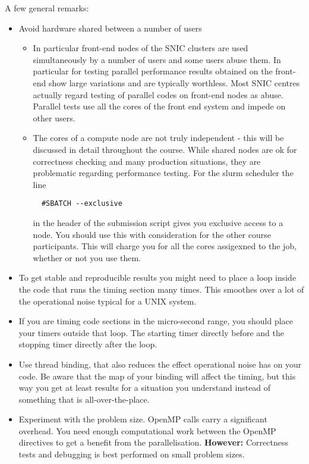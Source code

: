 \documentclass[a4paper,oneside,12pt]{article}
\begin{document}
A few general remarks:
\begin{itemize}
\item Avoid hardware shared between a number of users  
\begin{itemize}
\item In particular front-end nodes of the SNIC clusters are used simultaneously by a number of users and some users abuse them.  In particular for testing parallel performance results obtained on the front-end show large variations and are typically worthless.  Most SNIC centres actually regard testing of parallel codes on front-end nodes as abuse.  Parallel tests use all the cores of the front end system and impede on other users.
\item The cores of a compute node are not truly independent - this will be discussed in detail throughout the course.  While shared nodes are ok for correctness checking and many production situations, they are problematic regarding performance testing.  For the slurm scheduler the line
\begin{verbatim}
  #SBATCH --exclusive
\end{verbatim}
in the header of the submission script gives you exclusive access to a node.  You should use this with consideration for the other course participants.  This will charge you for all the cores assigexned to the job, whether or not you use them.
\end{itemize}
\item To get stable and reproducible results you might need to place a loop inside the code that runs the timing section many times.  This smoothes over a lot of the operational noise typical for a UNIX system.  

\item If you are timing code sections in the micro-second range, you should place your timers outside that loop.  The starting timer directly before and the stopping timer directly after the loop. 
\item Use thread binding, that also reduces the effect operational noise has on your code.  Be aware that the map of your binding will affect the timing, but this way you get at least results for a situation you understand instead of something that is all-over-the-place.
\item Experiment with the problem size.  OpenMP calls carry a significant overhead.  You need enough computational work between the OpenMP directives to get a benefit from the parallelisation. \textbf{However:} Correctness tests and debugging is best performed on small problem sizes.
\end{itemize}
\end{document}
